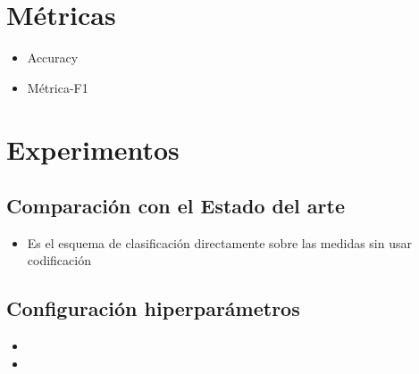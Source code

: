 \begin{table}[!h]
\centering{}\caption{Resumen de la división de los conjuntos de datos usados para evaluar el método propuesto.}
\label{tab:conjunto_datos}
\end{table}

\section{Métricas}

\begin{itemize}
    \item Accuracy
    \item Métrica-F1
\end{itemize}





\section{Experimentos}

\subsection{Comparación con el Estado del arte}

\begin{itemize}
    \item Es el esquema de clasificación directamente sobre las medidas sin usar codificación
\end{itemize}

\subsection{Configuración hiperparámetros}
\begin{itemize}
    \item 
    \item 
\end{itemize}

